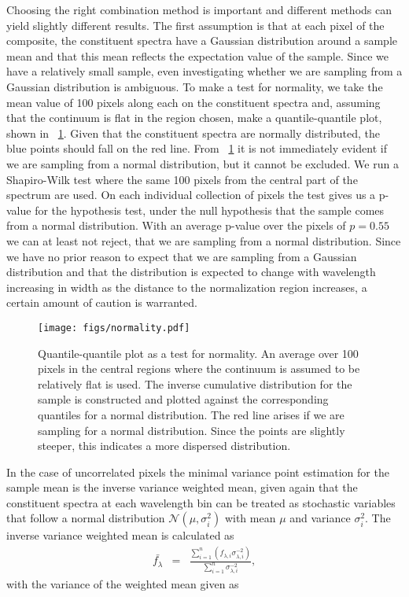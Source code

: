 \documentclass{aa}    %
\newcommand{\figref}[1]{\ref{fig:#1}}
\newcommand{\Fig}[1]{\figurename~\figref{#1}}
\newcommand{\fig}[1]{\Fig{#1}}
\newcommand{\figlabel}[1]{\label{fig:#1}}
\newcommand{\eqlabel}[1]{\label{eq:#1}}
\begin{document}
Choosing the right combination method is important and different
methods can yield slightly different results. The first assumption is
that at each pixel of the composite, the constituent spectra have a Gaussian
distribution around a sample mean and that this mean reflects the
expectation value of the sample. Since we have a relatively small
sample, even investigating whether we are sampling from a Gaussian
distribution is ambiguous. To make a test for normality, we take the
mean value of 100 pixels along each on the constituent spectra and, assuming that the continuum is
flat in the region chosen, make a quantile-quantile plot, shown in \Fig{normality}. Given that the constituent spectra are normally distributed, the blue points should
fall on the red line. From
\fig{normality} it is not immediately evident if we are sampling from
a normal distribution, but it cannot be excluded. We run a
Shapiro-Wilk test where the same 100 pixels from the central part of
the spectrum are used. On each individual collection of pixels the test
gives us a p-value for the hypothesis test,
under the null hypothesis that the sample comes from a normal
distribution. With an average p-value over the pixels of $p = 0.55$ we can at
least not reject, that we are sampling from a normal
distribution. Since we have no prior reason to expect that we are
sampling from a Gaussian distribution and that the distribution is
expected to change with wavelength increasing in width as the distance
to the normalization region increases, a certain amount of caution is
warranted.

\begin{figure}[t!]
  \centering
  \texttt{[image: figs/normality.pdf]}
  \caption[]{Quantile-quantile plot as a test for normality. An average over 100
pixels in the central regions where the continuum is assumed to be relatively
flat is used. The inverse cumulative distribution for the sample is constructed
and plotted against the corresponding quantiles for a normal distribution. The
red line arises if we are sampling for a normal distribution. Since the points
are slightly steeper, this indicates a more dispersed distribution.}
 \figlabel{normality}
\end{figure}

In the case of uncorrelated pixels the minimal variance point estimation for the
sample mean is the inverse variance weighted mean, given again that the
constituent spectra at each wavelength bin can be treated as stochastic
variables that follow a normal distribution $\mathcal{N}(\mu, \sigma_i^2)$ with
mean $\mu$ and variance $\sigma_i^2$. The inverse variance weighted mean is
calculated as
\begin{eqnarray} \eqlabel{wmean}
\bar{f_{\lambda}} &=& \frac{ \sum_{i=1}^n \left( f_{\lambda, i} \sigma_{\lambda,
i}^{-2} \right)}{\sum_{i=1}^n \sigma_{\lambda, i}^{-2}},
\end{eqnarray}
with the variance of the weighted mean given as
\end{document}
